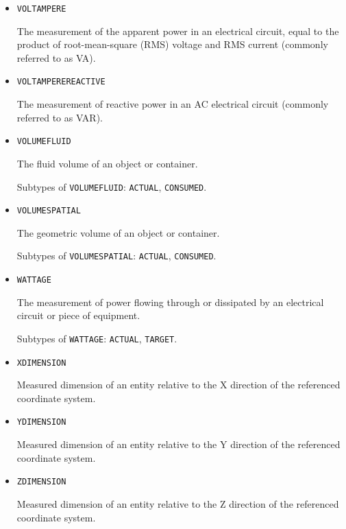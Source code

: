 \begin{itemize}
\item \texttt{VOLT\textunderscore AMPERE}  

The measurement of the apparent power in an electrical circuit, equal to the product of root-mean-square (RMS) voltage and RMS current (commonly referred to as VA).


\item \texttt{VOLT\textunderscore AMPERE\textunderscore REACTIVE}  

The measurement of reactive power in an AC electrical circuit (commonly referred to as VAR).


\item \texttt{VOLUME\textunderscore FLUID}  

The fluid volume of an object or container.

Subtypes of \texttt{VOLUME\textunderscore FLUID}: \texttt{ACTUAL}, \texttt{CONSUMED}.

\item \texttt{VOLUME\textunderscore SPATIAL}  

The geometric volume of an object or container.

Subtypes of \texttt{VOLUME\textunderscore SPATIAL}: \texttt{ACTUAL}, \texttt{CONSUMED}.

\item \texttt{WATTAGE}  

The measurement of power flowing through or dissipated by an electrical circuit or piece of equipment.

Subtypes of \texttt{WATTAGE}: \texttt{ACTUAL}, \texttt{TARGET}.

\item \texttt{X\textunderscore DIMENSION}  

Measured dimension of an entity relative to the X direction of the referenced coordinate system.



\item \texttt{Y\textunderscore DIMENSION}  

Measured dimension of an entity relative to the Y direction of the referenced coordinate system.


\item \texttt{Z\textunderscore DIMENSION}  

Measured dimension of an entity relative to the Z direction of the referenced coordinate system.

\end{itemize}



